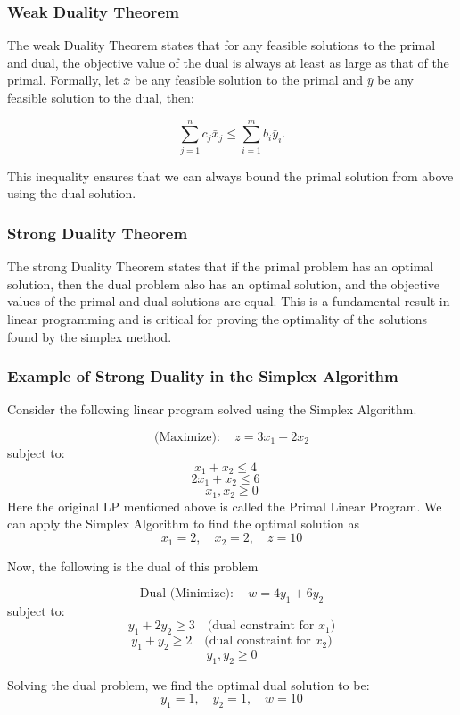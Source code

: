 \subsubsection{Weak Duality Theorem}

The weak Duality Theorem states that for any feasible solutions to the primal and dual, the objective value of the dual is always at least as large as that of the primal. Formally, let \(\bar{x}\) be any feasible solution to the primal and \(\bar{y}\) be any feasible solution to the dual, then:

\[
\sum_{j=1}^n c_j \bar{x}_j \leq \sum_{i=1}^m b_i \bar{y}_i.
\]

This inequality ensures that we can always bound the primal solution from above using the dual solution.

\subsubsection{Strong Duality Theorem}

The strong Duality Theorem states that if the primal problem has an optimal solution, then the dual problem also has an optimal solution, and the objective values of the primal and dual solutions are equal. This is a fundamental result in linear programming and is critical for proving the optimality of the solutions found by the simplex method.

\subsubsection{Example of Strong Duality in the Simplex Algorithm}

Consider the following linear program solved using the Simplex Algorithm.

\[
\text{(Maximize)}: \quad z = 3x_1 + 2x_2
\]
subject to:
\[
x_1 + x_2 \leq 4 \quad 
\]
\[
2x_1 + x_2 \leq 6 \quad 
\]
\[
x_1, x_2 \geq 0
\]
Here the original LP mentioned above is called the Primal Linear Program. We can apply the Simplex Algorithm to find the optimal solution as
\[
x_1 = 2, \quad x_2 = 2, \quad z = 10
\]

Now, the following is the dual of this problem

\[
\text{Dual (Minimize)}: \quad w = 4y_1 + 6y_2
\]
subject to:
\[
y_1 + 2y_2 \geq 3 \quad \text{(dual constraint for } x_1\text{)}
\]
\[
y_1 + y_2 \geq 2 \quad \text{(dual constraint for } x_2\text{)}
\]
\[
y_1, y_2 \geq 0
\]

Solving the dual problem, we find the optimal dual solution to be:
\[
y_1 = 1, \quad y_2 = 1, \quad w = 10
\]

